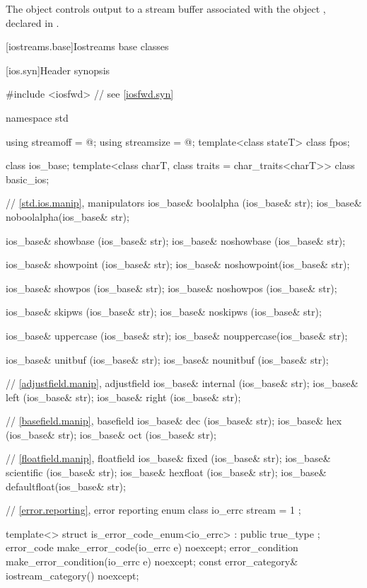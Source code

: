 \begin{itemdescr}
\pnum
The object 
controls output to a stream buffer associated with the object ,
declared in .
\end{itemdescr}

[iostreams.base]{Iostreams base classes}

[ios.syn]{Header  synopsis}

%
%
\begin{codeblock}
#include <iosfwd>   // see \ref{iosfwd.syn}

namespace std {
  using streamoff  = @\impdef@;
  using streamsize = @\impdef@;
  template<class stateT> class fpos;

  class ios_base;
  template<class charT, class traits = char_traits<charT>>
    class basic_ios;

  // \ref{std.ios.manip}, manipulators
  ios_base& boolalpha  (ios_base& str);
  ios_base& noboolalpha(ios_base& str);

  ios_base& showbase   (ios_base& str);
  ios_base& noshowbase (ios_base& str);

  ios_base& showpoint  (ios_base& str);
  ios_base& noshowpoint(ios_base& str);

  ios_base& showpos    (ios_base& str);
  ios_base& noshowpos  (ios_base& str);

  ios_base& skipws     (ios_base& str);
  ios_base& noskipws   (ios_base& str);

  ios_base& uppercase  (ios_base& str);
  ios_base& nouppercase(ios_base& str);

  ios_base& unitbuf    (ios_base& str);
  ios_base& nounitbuf  (ios_base& str);

  // \ref{adjustfield.manip}, adjustfield
  ios_base& internal   (ios_base& str);
  ios_base& left       (ios_base& str);
  ios_base& right      (ios_base& str);

  // \ref{basefield.manip}, basefield
  ios_base& dec        (ios_base& str);
  ios_base& hex        (ios_base& str);
  ios_base& oct        (ios_base& str);

  // \ref{floatfield.manip}, floatfield
  ios_base& fixed      (ios_base& str);
  ios_base& scientific (ios_base& str);
  ios_base& hexfloat   (ios_base& str);
  ios_base& defaultfloat(ios_base& str);

  // \ref{error.reporting}, error reporting
  enum class io_errc {
    stream = 1
  };

  template<> struct is_error_code_enum<io_errc> : public true_type { };
  error_code make_error_code(io_errc e) noexcept;
  error_condition make_error_condition(io_errc e) noexcept;
  const error_category& iostream_category() noexcept;
}
\end{codeblock}
%
%
%
%
%

